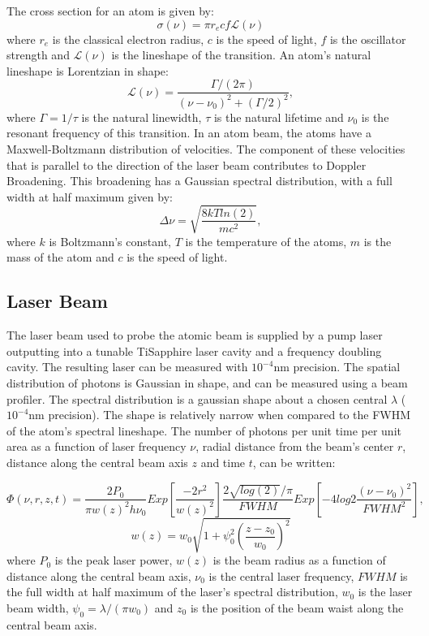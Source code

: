 \documentclass[12pt, a4paper]{article}
\begin{document}
The cross section for an atom is given by:
\begin{equation}
\sigma(\nu) = \pi r_e c f \mathscr{L}(\nu)
\end{equation}
where $r_e$ is the classical electron radius, $c$ is the speed of light, $f$ is the oscillator strength and $\mathscr{L}(\nu)$ is the lineshape of the transition. An atom's natural lineshape is Lorentzian in shape:
\begin{equation}
\mathscr{L}(\nu) = \frac{\Gamma/(2 \pi)}{(\nu-\nu_0)^2+(\Gamma/2)^2},
\end{equation}
where $\Gamma = 1/\tau$ is the natural linewidth, $\tau$ is the natural lifetime and $\nu_0$ is the resonant frequency of this transition. In an atom beam, the atoms have a Maxwell-Boltzmann distribution of velocities. The component of these velocities that is parallel to the direction of the laser beam contributes to Doppler Broadening. This broadening has a Gaussian spectral distribution, with a full width at half maximum given by:
\begin{equation}
\Delta \nu = \sqrt{\frac{8kT ln(2)}{mc^2}},
\end{equation}
where $k$ is Boltzmann's constant, $T$ is the temperature of the atoms, $m$ is the mass of the atom and $c$ is the speed of light.
\subsection{Laser Beam}
The laser beam used to probe the atomic beam is supplied by a pump laser outputting into a tunable TiSapphire laser cavity and a frequency doubling cavity. The resulting laser can be measured with $10^{-4}$nm precision. The spatial distribution of photons is Gaussian in shape, and can be measured using a beam profiler. The spectral distribution is a gaussian shape about a chosen central $\lambda$ ($10^{-4}$nm precision). The shape is relatively narrow when compared to the FWHM of the atom's spectral lineshape. The number of photons per unit time per unit area as a function of laser frequency $\nu$, radial distance from the beam's center $r$, distance along the central beam axis $z$ and time $t$, can be written:

\begin{equation}
\Phi(\nu,r,z,t) = \frac{2P_0}{\pi w(z)^2 h \nu_0} Exp[\frac{-2r^2}{w(z)^2}]\frac{2\sqrt{log(2)}/\pi}{FWHM}Exp[-4log{2}\frac{(\nu-\nu_0)^2}{FWHM^2}],
\end{equation}
\begin{equation}
w(z) = w_0\sqrt{1+\psi_0^2(\frac{z-z_0}{w_0})^2}
\end{equation}
where $P_0$ is the peak laser power, $w(z)$ is the beam radius as a function of distance along the central beam axis, $\nu_0$ is the central laser frequency, $FWHM$ is the full width at half maximum of the laser's spectral distribution, $w_0$ is the laser beam width, $\psi_0 = \lambda/(\pi w_0)$ and $z_0$ is the position of the beam waist along the central beam axis.
\end{document}
